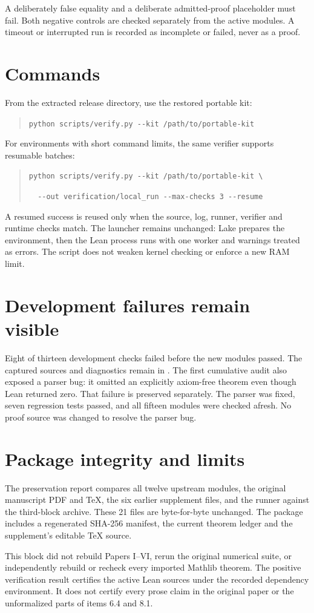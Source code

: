 \documentclass[10pt,letterpaper]{article}
\begin{document}
A deliberately false equality and a deliberate admitted-proof placeholder must fail. Both negative controls are checked separately from the active modules. A timeout or interrupted run is recorded as incomplete or failed, never as a proof.

\section*{Commands}
From the extracted release directory, use the restored portable kit:
\begin{quote}\small
\verb|python scripts/verify.py --kit /path/to/portable-kit|
\end{quote}
For environments with short command limits, the same verifier supports resumable batches:
\begin{quote}\small
\verb|python scripts/verify.py --kit /path/to/portable-kit \|\par
\verb|  --out verification/local_run --max-checks 3 --resume|
\end{quote}
A resumed success is reused only when the source, log, runner, verifier and runtime checks match. The launcher remains unchanged: Lake prepares the environment, then the Lean process runs with one worker and warnings treated as errors. The script does not weaken kernel checking or enforce a new RAM limit.

\section*{Development failures remain visible}
Eight of thirteen development checks failed before the new modules passed. The captured sources and diagnostics remain in . The first cumulative audit also exposed a parser bug: it omitted an explicitly axiom-free theorem even though Lean returned zero. That failure is preserved separately. The parser was fixed, seven regression tests passed, and all fifteen modules were checked afresh. No proof source was changed to resolve the parser bug.

\section*{Package integrity and limits}
The preservation report compares all twelve upstream modules, the original manuscript PDF and TeX, the six earlier supplement files, and the runner against the third-block archive. These 21 files are byte-for-byte unchanged. The package includes a regenerated SHA-256 manifest, the current theorem ledger and the supplement's editable TeX source.

This block did not rebuild Papers I--VI, rerun the original numerical suite, or independently rebuild or recheck every imported Mathlib theorem. The positive verification result certifies the active Lean sources under the recorded dependency environment. It does not certify every prose claim in the original paper or the unformalized parts of items 6.4 and 8.1.
\end{document}
